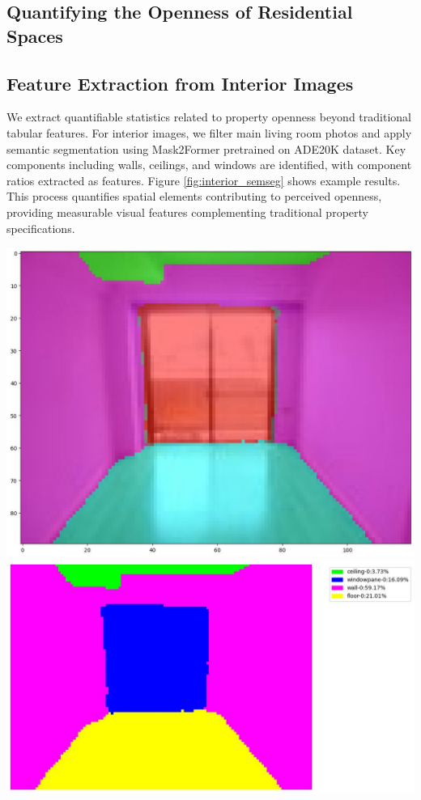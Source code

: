 \documentclass[11pt,a4paper]{article}
\begin{document}
\begin{multicols}{2}
\section{Quantifying the Openness of Residential Spaces}

\subsection{Feature Extraction from Interior Images}
We extract quantifiable statistics related to property openness beyond traditional tabular features. 
For interior images, we filter main living room photos and apply semantic segmentation using 
Mask2Former pretrained on ADE20K dataset. Key components including walls, ceilings, and windows 
are identified, with component ratios extracted as features. Figure \ref{fig:interior_semseg} 
shows example results. This process quantifies spatial elements contributing to perceived openness, 
providing measurable visual features complementing traditional property specifications.
\begin{flushleft}
    \includegraphics[width=0.8\columnwidth]{plots/exp_lv_semseg_2.jpg}
    \\[0.5em]
    \includegraphics[width=\columnwidth]{plots/exp_lv_semseg_1.jpg}
    \label{fig:interior_semseg}
\end{flushleft}

\end{multicols}
\end{document}
